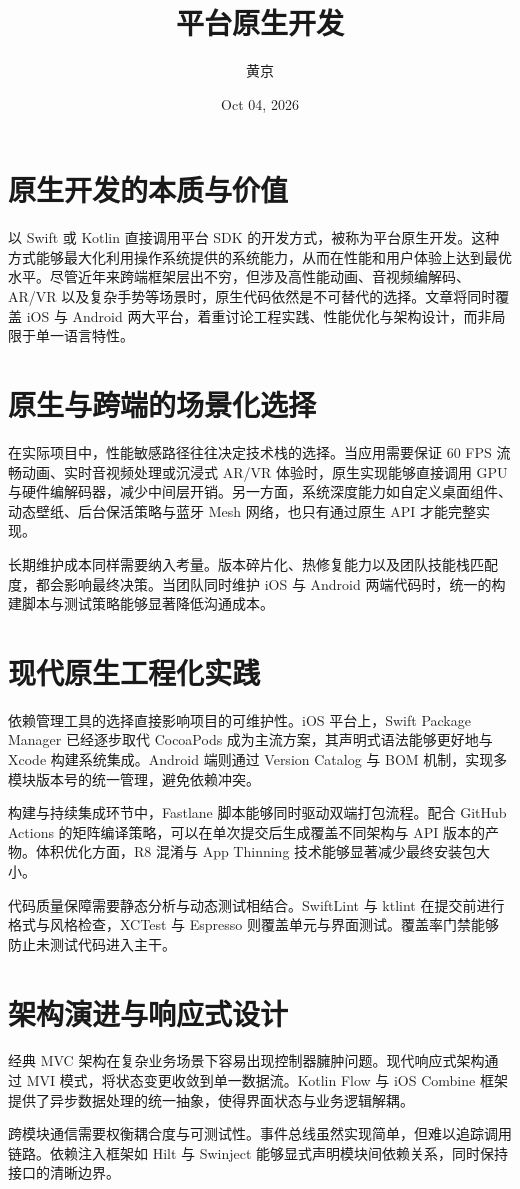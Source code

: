 \title{平台原生开发}
\author{黄京}
\date{Oct 04, 2026}
\maketitle
\chapter{原生开发的本质与价值}
以 Swift 或 Kotlin 直接调用平台 SDK 的开发方式，被称为平台原生开发。这种方式能够最大化利用操作系统提供的系统能力，从而在性能和用户体验上达到最优水平。尽管近年来跨端框架层出不穷，但涉及高性能动画、音视频编解码、AR/VR 以及复杂手势等场景时，原生代码依然是不可替代的选择。文章将同时覆盖 iOS 与 Android 两大平台，着重讨论工程实践、性能优化与架构设计，而非局限于单一语言特性。\par
\chapter{原生与跨端的场景化选择}
在实际项目中，性能敏感路径往往决定技术栈的选择。当应用需要保证 60 FPS 流畅动画、实时音视频处理或沉浸式 AR/VR 体验时，原生实现能够直接调用 GPU 与硬件编解码器，减少中间层开销。另一方面，系统深度能力如自定义桌面组件、动态壁纸、后台保活策略与蓝牙 Mesh 网络，也只有通过原生 API 才能完整实现。\par
长期维护成本同样需要纳入考量。版本碎片化、热修复能力以及团队技能栈匹配度，都会影响最终决策。当团队同时维护 iOS 与 Android 两端代码时，统一的构建脚本与测试策略能够显著降低沟通成本。\par
\chapter{现代原生工程化实践}
依赖管理工具的选择直接影响项目的可维护性。iOS 平台上，Swift Package Manager 已经逐步取代 CocoaPods 成为主流方案，其声明式语法能够更好地与 Xcode 构建系统集成。Android 端则通过 Version Catalog 与 BOM 机制，实现多模块版本号的统一管理，避免依赖冲突。\par
构建与持续集成环节中，Fastlane 脚本能够同时驱动双端打包流程。配合 GitHub Actions 的矩阵编译策略，可以在单次提交后生成覆盖不同架构与 API 版本的产物。体积优化方面，R8 混淆与 App Thinning 技术能够显著减少最终安装包大小。\par
代码质量保障需要静态分析与动态测试相结合。SwiftLint 与 ktlint 在提交前进行格式与风格检查，XCTest 与 Espresso 则覆盖单元与界面测试。覆盖率门禁能够防止未测试代码进入主干。\par
\chapter{架构演进与响应式设计}
经典 MVC 架构在复杂业务场景下容易出现控制器臃肿问题。现代响应式架构通过 MVI 模式，将状态变更收敛到单一数据流。Kotlin Flow 与 iOS Combine 框架提供了异步数据处理的统一抽象，使得界面状态与业务逻辑解耦。\par
跨模块通信需要权衡耦合度与可测试性。事件总线虽然实现简单，但难以追踪调用链路。依赖注入框架如 Hilt 与 Swinject 能够显式声明模块间依赖关系，同时保持接口的清晰边界。\par
